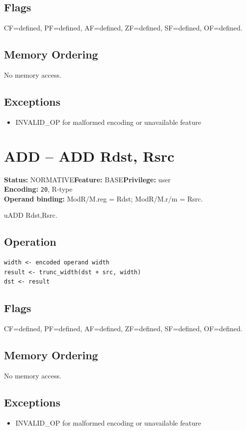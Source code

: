 \documentclass[10pt]{article}
\begin{document}
\subsection*{Flags}
CF=defined, PF=defined, AF=defined, ZF=defined, SF=defined, OF=defined.
\subsection*{Memory Ordering}
No memory access.
\subsection*{Exceptions}
\begin{itemize}
\item INVALID\_OP for malformed encoding or unavailable feature
\end{itemize}
\clearpage

\section{ADD -- ADD Rdst, Rsrc}
\textbf{Status:} NORMATIVE\quad \textbf{Feature:} BASE\quad \textbf{Privilege:} user\\
\textbf{Encoding:} \texttt{20}, R-type\\
\textbf{Operand binding:} ModR/M.reg = Rdst; ModR/M.r/m = Rsrc.

uADD Rdst,Rsrc.

\subsection*{Operation}
\begin{lstlisting}
width <- encoded operand width
result <- trunc_width(dst + src, width)
dst <- result
\end{lstlisting}
\subsection*{Flags}
CF=defined, PF=defined, AF=defined, ZF=defined, SF=defined, OF=defined.
\subsection*{Memory Ordering}
No memory access.
\subsection*{Exceptions}
\begin{itemize}
\item INVALID\_OP for malformed encoding or unavailable feature
\end{itemize}
\clearpage
\end{document}

